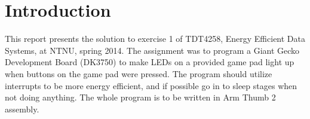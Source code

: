 \section{Introduction}

This report presents the solution to exercise 1 of TDT4258, Energy Efficient Data Systems, at NTNU, spring 2014.
The assignment was to program a Giant Gecko Development Board (DK3750) to make LEDs on a provided game pad light up when buttons on the game pad were pressed.
The program should utilize interrupts to be more energy efficient, and if possible go in to sleep stages when not doing anything.
The whole program is to be written in Arm Thumb 2 assembly.

